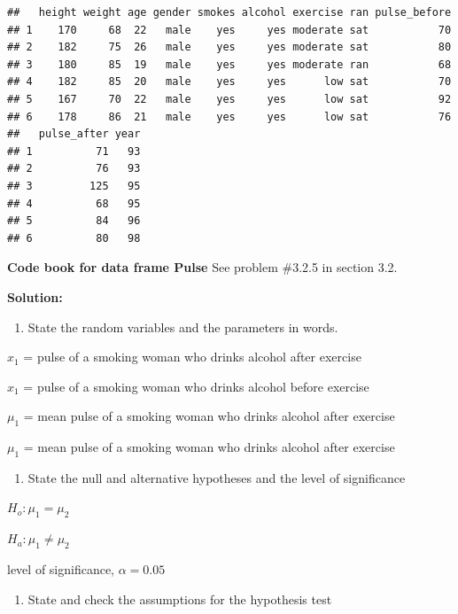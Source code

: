 \documentclass[]{book}
\providecommand{\tightlist}{%
  \setlength{\itemsep}{0pt}\setlength{\parskip}{0pt}}
\begin{document}
\begin{verbatim}
##   height weight age gender smokes alcohol exercise ran pulse_before
## 1    170     68  22   male    yes     yes moderate sat           70
## 2    182     75  26   male    yes     yes moderate sat           80
## 3    180     85  19   male    yes     yes moderate ran           68
## 4    182     85  20   male    yes     yes      low sat           70
## 5    167     70  22   male    yes     yes      low sat           92
## 6    178     86  21   male    yes     yes      low sat           76
##   pulse_after year
## 1          71   93
## 2          76   93
## 3         125   95
## 4          68   95
## 5          84   96
## 6          80   98
\end{verbatim}

\textbf{Code book for data frame Pulse} See problem \#3.2.5 in section 3.2.

\textbf{Solution:}

\begin{enumerate}
\def\labelenumi{\arabic{enumi}.}
\tightlist
\item
  State the random variables and the parameters in words.
\end{enumerate}

\(x_1\) = pulse of a smoking woman who drinks alcohol after exercise

\(x_1\) = pulse of a smoking woman who drinks alcohol before exercise

\(\mu_1\) = mean pulse of a smoking woman who drinks alcohol after exercise

\(\mu_1\) = mean pulse of a smoking woman who drinks alcohol after exercise

\begin{enumerate}
\def\labelenumi{\arabic{enumi}.}
\setcounter{enumi}{1}
\tightlist
\item
  State the null and alternative hypotheses and the level of significance
\end{enumerate}

\(H_o: \mu_1=\mu_2\)

\(H_a: \mu_1\ne \mu_2\)

level of significance, \(\alpha=0.05\)

\begin{enumerate}
\def\labelenumi{\arabic{enumi}.}
\setcounter{enumi}{2}
\tightlist
\item
  State and check the assumptions for the hypothesis test
\end{enumerate}
\end{document}
